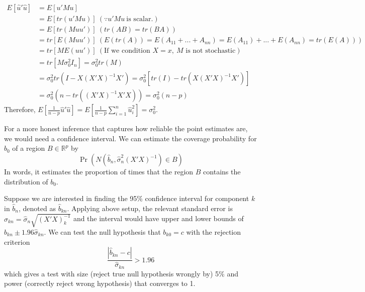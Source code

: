 \documentclass[12pt]{article}
\theoremstyle{definition}
\theoremstyle{property}
\theoremstyle{assumption}
\theoremstyle{example}
\theoremstyle{comment}
\newtheorem{comment}{Comment}[section]
\begin{document}
\begin{align*}
E[\hat{u}'\hat{u}]&=E[u'Mu]\\
&=E[tr(u'Mu)] \ (\because u'Mu \ \text{is scalar.})\\
&=E[tr(Muu')] \ (tr(AB)=tr(BA))\\
&=tr[E(Muu')] \ (E(tr(A)) =E(A_{11}+...+A_{nn})=E(A_{11})+...+E(A_{nn})=tr(E(A)))\\
&=tr[ME(uu')] \ (\text{If we condition }X=x,\ \text{$M$ is not stochastic})\\
&=tr[M \sigma_0^2 I_n] = \sigma_0^2 tr(M)\\
&=\sigma_0^2 tr(I-X(X'X)^{-1}X')=\sigma_0^2[tr(I)-tr(X(X'X)^{-1}X')]\\
&=\sigma_0^2(n-tr((X'X)^{-1}X'X)) = \sigma_0^2(n-p)
\end{align*}
Therefore, $E\left[\frac{1}{n-p}\hat{u}'\hat{u}\right]=E\left[\frac{1}{n-p}\sum_{i=1}^n \hat{u}_i^2\right]=\sigma_0^2$.\par
For a more honest inference that captures how reliable the point estimates are, we would need a confidence interval. We can estimate the coverage probability for $b_0$ of a region $B\in\mathbb{R}^p$ by
\[
\Pr(N(\hat{b}_n, \hat{\sigma}_n^2(X'X)^{-1})\in B)
\]
In words, it estimates the proportion of times that the region $B$ contains the distribution of $b_0$. \par
Suppose we are interested in finding the 95\% confidence interval for component $k$ in $\hat{b}_n$, denoted as $\hat{b}_{kn}$. Applying above setup, the relevant standard error is $\hat{\sigma}_{kn}=\hat{\sigma}_n\sqrt{(X'X)^{-1}_{k}}$ and the interval would have upper and lower bounds of $\hat{b}_{kn}\pm 1.96\hat{\sigma}_{kn}$. We can test the null hypothesis that $b_{k0}=c$ with the rejection criterion
\[
\frac{|\hat{b}_{kn}-c|}{\hat{\sigma}_{kn}}>1.96
\]
which gives a test with size (reject true null hypothesis wrongly by) 5\% and power (correctly reject wrong hypothesis) that converges to 1. \par
\begin{mdframed}[backgroundcolor=yellow!5] 
\begin{comment}[What is a confidence interval?]
There are some cautions when interpreting the confidence interval. Let $(l,u)$ be the 95\% confidence interval after a sample is drawn. A 95\% confidence interval can be interpreted as saying that \textbf{there is a 95\% probability that the $(l,u)$ confidence interval encompasses the true value}. Notice that this is a probability statement about the confidence interval and not the true value. True value of $\beta_{k0}$ should not be treated as a  random variable. Therefore, it is not necessarily true to say that there is a 95\% probability that $b_{0k}$ is included in a particular $(l,u)$ confidence interval. Another way of seeing this is if the sample has been drawn $N$ times, the fraction of calculated confidence intervals (that differs for each draw) which encompasses the true value is 95\%, or that $N\times 0.95$ confidence intervals encompass true parameter.
\end{comment}
\end{mdframed} 
\end{document}

